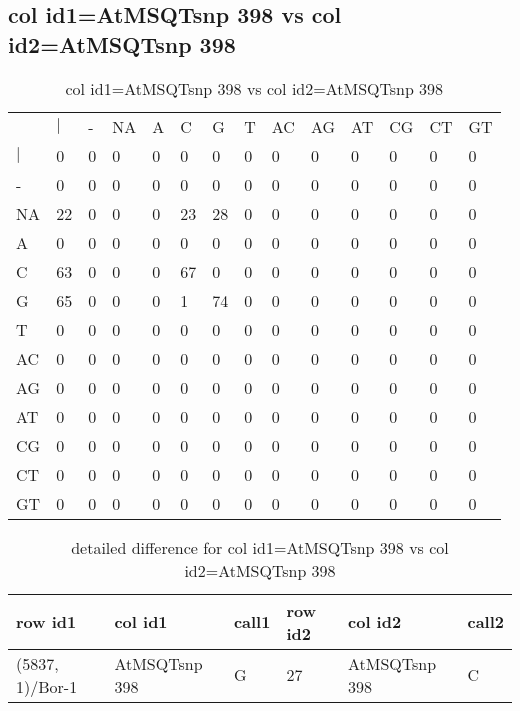 \subsection{col id1=AtMSQTsnp 398 vs col id2=AtMSQTsnp 398}
\begin{center}
\begin{longtable}{|l|l|l|l|l|l|l|l|l|l|l|l|l|l|}
\caption{col id1=AtMSQTsnp 398 vs col id2=AtMSQTsnp 398} \label{table_dm912}\\
\hline
\\
\hline
&$|$&-&NA&A&C&G&T&AC&AG&AT&CG&CT&GT\\
$|$&0&0&0&0&0&0&0&0&0&0&0&0&0\\
-&0&0&0&0&0&0&0&0&0&0&0&0&0\\
NA&22&0&0&0&23&28&0&0&0&0&0&0&0\\
A&0&0&0&0&0&0&0&0&0&0&0&0&0\\
C&63&0&0&0&67&0&0&0&0&0&0&0&0\\
G&65&0&0&0&1&74&0&0&0&0&0&0&0\\
T&0&0&0&0&0&0&0&0&0&0&0&0&0\\
AC&0&0&0&0&0&0&0&0&0&0&0&0&0\\
AG&0&0&0&0&0&0&0&0&0&0&0&0&0\\
AT&0&0&0&0&0&0&0&0&0&0&0&0&0\\
CG&0&0&0&0&0&0&0&0&0&0&0&0&0\\
CT&0&0&0&0&0&0&0&0&0&0&0&0&0\\
GT&0&0&0&0&0&0&0&0&0&0&0&0&0\\
\hline
\end{longtable}
\end{center}

\begin{center}
\begin{longtable}{|l|l|l|l|l|l|}
\caption{detailed difference for col id1=AtMSQTsnp 398 vs col id2=AtMSQTsnp 398} \label{table_dm913}\\
\hline
row id1&col id1&call1&row id2&col id2&call2\\
\hline
(5837, 1)/Bor-1&AtMSQTsnp 398&G&27&AtMSQTsnp 398&C\\
\hline
\end{longtable}
\end{center}


